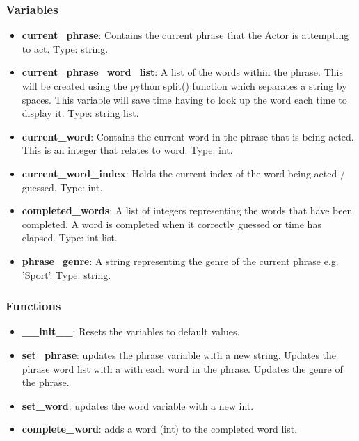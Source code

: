 \documentclass{article}
\begin{document}
\subsubsection{Variables}
\begin{itemize}

	\item \textbf{current\_phrase}: Contains the current phrase that the Actor is attempting to act. Type: string.
	
	\item \textbf{current\_phrase\_word\_list}: A list of the words within the phrase. This will be created using the python split() function which separates a string by spaces. This variable will save time having to look up the word each time to display it. Type: string list.

	\item \textbf{current\_word}: Contains the current word in the phrase that is being acted. This is an integer that relates to word. Type: int.
	
	\item \textbf{current\_word\_index}: Holds the current index of the word being acted / guessed. Type: int.
	
	\item \textbf{completed\_words}: A list of integers representing the words that have been completed. A word is completed when it correctly guessed or time has elapsed. Type: int list.
	
	\item \textbf{phrase\_genre}: A string representing the genre of the current phrase e.g. 'Sport'. Type: string.
	
\end{itemize}

\subsubsection{Functions}

\begin{itemize}

	\item \textbf{\_\_init\_\_}: Resets the variables to default values.

	\item \textbf{set\_phrase}: updates the phrase variable with a new string. Updates the phrase word list with a with each word in the phrase. Updates the genre of the phrase.
	
	\item \textbf{set\_word}: updates the word variable with a  new int.
	
	\item \textbf{complete\_word}: adds a word (int) to the completed word list.

\end{itemize}
\end{document}
